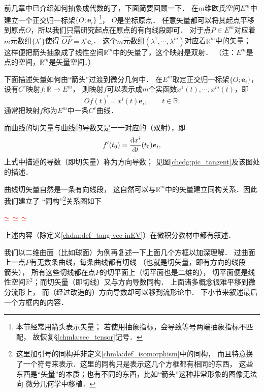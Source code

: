 前几章中已介绍如何抽象成代数的了，下面简要回顾一下．
在$m$维欧氏空间$E^m$中建立一个正交归一标架$\{O;\boldsymbol{e}_i\}$
{\footnote{本节经常用箭头表示矢量；
        若使用抽象指标，会导致等号两端抽象指标不匹配，
    故恢复\S\ref{chmla:sec_tensor}记号．}}，
$O$是坐标原点．
任意矢量都可以将其起点平移到原点$O$，所以我们只需研究起点在原点的有向线段即可．
对于点$P \in E^m$对应着$m$元数组$\{\lambda^i\}$使得
$    \overrightarrow{OP} = \lambda^i \boldsymbol{e}_i $．
这个$m$元数组$(\lambda^1,\cdots,\lambda^m)$对应着$\mathbb{R}^m$中的矢量；
这样便把箭头抽象成了线性空间$\mathbb{R}^m$中的矢量了，这个映射是双射．
（注：$E^m$是{\kaishu 点}的空间，$\mathbb{R}^m$是{\kaishu 矢量}空间．）

下面描述矢量如何由“箭头”过渡到微分几何中．
在$E^m$取定正交归一标架$\{O;\boldsymbol{e}_i\}$，设有$C^r$映射$f:\mathbb{R} \to E^m$，
则映射$f$可以表示成$m$个实函数$x^1(t),\cdots, x^m(t)$，即
\begin{equation}
    \overrightarrow{Of(t)} = x^i(t) \boldsymbol{e}_i , \qquad t\in \mathbb{R} .
\end{equation}
通常把映射$f$称为$E^m$中一条$C^r${\kaishu 曲线}．

而曲线的切矢量与曲线的导数又是一一对应的（双射），即
\begin{equation}\label{chdm:eqn_gfv}
    f'(t_0) = \frac{{\rm d} x^i}{{\rm d}t}(t_0)\boldsymbol{e}_i ,
\end{equation}
上式中描述的导数（即切矢量）称为{\kaishu 方向导数}；
见图\ref{chcdg:pic_tangent}及该图处的描述．

曲线切矢量自然是一条有向线段，
这自然可以与$\mathbb{R}^m$中的矢量建立同构关系．因此我们建立了
“同构”{\footnote{这里加引号的同构并非定义\ref{chmla:def_isomorphism}中的同构，
        而且特意换了一个符号来表示．这里的同构只是表示这几个方框都有相同的东西，
        这些东西是“矢量”的本质；也有不同的东西，比如“箭头”这种非常形象的图像无法向
        微分几何学中移植．}}关系图如下
\begin{center}
     $\color{red}\simeq$
     $\color{red}\simeq$
     $\color{red}\simeq$
\end{center}
上述内容（除定义\ref{chdm:def_tang-vec-inEV}）在微积分教材中都有叙述．

我们以二维曲面（比如球面）为例再复述一下上面几个方框以加深理解．
过曲面上一点$P$有无数条曲线，每条曲线都有切线
（也就是切矢量，即有方向的线段——箭头），
所有这些切线都在点$P$的切平面上（切平面也是二维的），
切平面便是线性空间$\mathbb{R}^2$；而切矢量（即切线）又与方向导数同构．
上面诸多概念很难平移到微分流形上，
而（经过改造的）方向导数却可以移到流形论中．
下小节来叙述最后一个方框内的内容．


